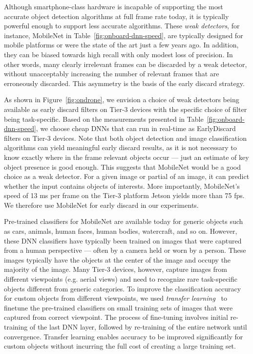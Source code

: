 Although smartphone-class hardware is incapable of supporting the most accurate
object detection algorithms at full frame rate today, it is typically powerful
enough to support less accurate algorithms.  These {\em weak detectors}, for
instance, MobileNet in Table~\ref{fig:onboard-dnn-speed}, are typically
designed for mobile platforms or were the state of the art just a few years ago.
In addition, they can be biased towards high recall with only modest loss of
precision. In other words, many clearly irrelevant frames can be discarded by a
weak detector, without unacceptably increasing the number of relevant frames
that are erroneously discarded.  This asymmetry is the basis of the early
discard strategy.

As shown in Figure~\ref{fig:ondrone}, we envision a choice of weak detectors
being available as early discard filters on Tier-3 devices with the specific
choice of filter being task-specific.  Based on the measurements presented in
Table~\ref{fig:onboard-dnn-speed}, we choose cheap DNNs that can run in
real-time as EarlyDiscard filters on Tier-3 devices. Note that both object
detection and image classification algorithms can yield meaningful early discard
results, as it is not necessary to know exactly where in the frame relevant
objects occur --- just an estimate of key object presence is good enough. This
suggests that MobileNet would be a good choice as a weak detector. For a given
image or partial of an image, it can predict whether the input contains objects
of interests. More importantly, MobileNet's speed of 13 ms per frame on the
Tier-3 platform Jetson yields more than 75 fps. We therefore use MobileNet for
early discard in our experiments.

Pre-trained classifiers for MobileNet are available today for generic objects
such as cars, animals, human faces, human bodies, watercraft, and so on.
However, these DNN classifiers have typically been trained on images that were
captured from a human perspective --- often by a camera held or worn by a
person. These images typically have the objects at the center of the image and
occupy the majority of the image. Many Tier-3 devices, however, capture images
from different viewpoints (e.g. aerial views) and need to recognize rare
task-specific objects different from generic categories. To improve the
classification accuracy for custom objects from different viewpoints, we used
    {\em transfer learning}~\cite{Yosinski2014} to finetune the pre-trained
classifiers on small training sets of images that were captured from correct
viewpoint. The process of fine-tuning involves initial re-training of the last
DNN layer, followed by re-training of the entire network until convergence.
Transfer learning enables accuracy to be improved significantly for custom
objects without incurring the full cost of creating a large training set.

